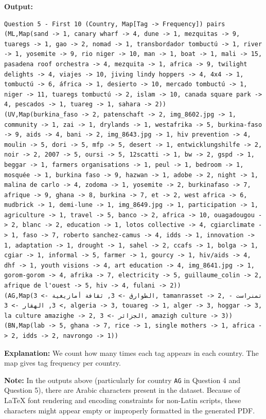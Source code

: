 \documentclass[11pt]{article}
\begin{document}
\textbf{Output:}
\begin{lstlisting}
Question 5 - First 10 (Country, Map[Tag -> Frequency]) pairs
(ML,Map(sand -> 1, canary wharf -> 4, dune -> 1, mezquitas -> 9, tuaregs -> 1, gao -> 2, nomad -> 1, transbordador tombuctú -> 1, river -> 1, yosemite -> 9, rio niger -> 10, man -> 1, boat -> 1, mali -> 15, pasadena roof orchestra -> 4, mezquita -> 1, africa -> 9, twilight delights -> 4, viajes -> 10, jiving lindy hoppers -> 4, 4x4 -> 1, tombuctú -> 6, áfrica -> 1, desierto -> 10, mercado tombuctú -> 1, niger -> 11, tuaregs tombuctú -> 2, islam -> 10, canada square park -> 4, pescados -> 1, tuareg -> 1, sahara -> 2))
(UV,Map(burkina_faso -> 2, patenschaft -> 2, img_8602.jpg -> 1, community -> 1, zai -> 1, drylands -> 1, westafrika -> 5, burkina-faso -> 9, aids -> 4, bani -> 2, img_8643.jpg -> 1, hiv prevention -> 4, moulin -> 5, dori -> 5, mfp -> 5, desert -> 1, entwicklungshilfe -> 2, noir -> 2, 2007 -> 5, oursi -> 5, 12scatti -> 1, bw -> 2, gspd -> 1, beggar -> 1, farmers organisations -> 1, peul -> 1, bedroom -> 1, mosquée -> 1, burkina faso -> 9, hazwan -> 1, adobe -> 2, night -> 1, malina de carlo -> 4, zodoma -> 1, yosemite -> 2, burkinafaso -> 7, afrique -> 9, ghana -> 8, burkina -> 7, et -> 2, west africa -> 6, mudbrick -> 1, demi-lune -> 1, img_8649.jpg -> 1, participation -> 1, agriculture -> 1, travel -> 5, banco -> 2, africa -> 10, ouagadougou -> 2, blanc -> 2, education -> 1, lotos collective -> 4, cgiarclimate -> 1, faso -> 7, roberto sanchez-camus -> 4, idds -> 1, innovation -> 1, adaptation -> 1, drought -> 1, sahel -> 2, ccafs -> 1, bolga -> 1, cgiar -> 1, informal -> 5, farmer -> 1, gourcy -> 1, hiv/aids -> 4, dhf -> 1, youth visions -> 4, art education -> 4, img_8641.jpg -> 1, gorom-gorom -> 4, afrika -> 7, electricity -> 5, guillaume_colin -> 2, afrique de l'ouest -> 5, hiv -> 4, fulani -> 2))
(AG,Map(الطوارق -> 3, ثقافة أمازيغية -> 3, tamanrasset -> 2, تمنراست -> 3, الهقار -> 3, algeria -> 3, touareg -> 1, alger -> 3, hoggar -> 3, la culture amazighe -> 2, الجزائر -> 3, amazigh culture -> 3))
(BN,Map(lab -> 5, ghana -> 7, rice -> 1, single mothers -> 1, africa -> 2, idds -> 2, navrongo -> 1))
\end{lstlisting}

\textbf{Explanation:} We count how many times each tag appears in each country. The map gives tag frequency per country.

\textbf{Note:} In the outputs above (particularly for country \texttt{AG} in Question 4 and Question 5), there are Arabic characters present in the dataset. Because of LaTeX font rendering and encoding constraints for non-Latin scripts, these characters might appear empty or improperly formatted in the generated PDF.
\end{document}
